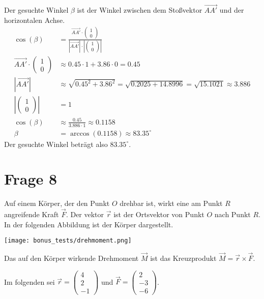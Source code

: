 Der gesuchte Winkel \(\beta\) ist der Winkel zwischen dem Stoßvektor \(\vec{AA'}\) und der horizontalen Achse.
\begin{align*}
    \cos(\beta) &= \frac{\vec{AA'} \cdot \begin{pmatrix} 1 \\ 0 \end{pmatrix}}{|\vec{AA'}| \cdot |\begin{pmatrix} 1 \\ 0 \end{pmatrix}|} \\
    \vec{AA'} \cdot \begin{pmatrix} 1 \\ 0 \end{pmatrix} &\approx 0.45 \cdot 1 + 3.86 \cdot 0 = 0.45 \\
    |\vec{AA'}| &\approx \sqrt{0.45^2 + 3.86^2} = \sqrt{0.2025 + 14.8996} = \sqrt{15.1021} \approx 3.886 \\
    |\begin{pmatrix} 1 \\ 0 \end{pmatrix}| &= 1 \\
    \cos(\beta) &\approx \frac{0.45}{3.886 \cdot 1} \approx 0.1158 \\
    \beta &= \arccos(0.1158) \approx 83.35^\circ
\end{align*}
Der gesuchte Winkel beträgt also \(83.35^\circ\).

\section{Frage 8}

Auf einem Körper, der den Punkt $O$ drehbar ist, wirkt eine am Punkt $R$ angreifende Kraft $\vec{F}$. Der vektor $\vec{r}$ ist der Ortsvektor von Punkt $O$ nach Punkt $R$. In der folgenden Abbildung ist der Körper dargestellt.

\texttt{[image: bonus\_tests/drehmoment.png]}


Das auf den Körper wirkende Drehmoment $\vec{M}$ ist das Kreuzprodukt $\vec{M} = \vec{r} \times \vec{F}$.

Im folgenden sei $\vec{r} = \begin{pmatrix}
        4 \\ 2 \\ -1
    \end{pmatrix}$ und $\vec{F} = \begin{pmatrix}
        2 \\ -3 \\ -6
    \end{pmatrix}$.

